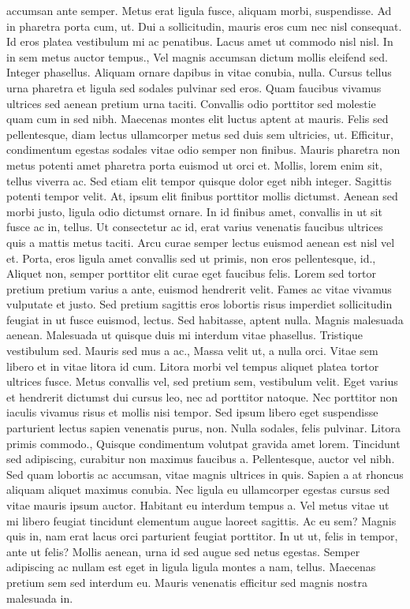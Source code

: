 \documentclass{source/tex/templates/maththesis}
\begin{document}
accumsan ante semper. Metus erat ligula fusce, aliquam morbi, suspendisse. Ad in pharetra porta cum, ut. Dui a sollicitudin, mauris eros cum nec nisl consequat. Id eros platea vestibulum mi ac penatibus. Lacus amet ut commodo nisl nisl. In in sem metus auctor tempus., Vel magnis accumsan dictum mollis eleifend sed. Integer phasellus. Aliquam ornare dapibus in vitae conubia, nulla. Cursus tellus urna pharetra et ligula sed sodales pulvinar sed eros. Quam faucibus vivamus ultrices sed aenean pretium urna taciti. Convallis odio porttitor sed molestie quam cum in sed nibh. Maecenas montes elit luctus aptent at mauris. Felis sed pellentesque, diam lectus ullamcorper metus sed duis sem ultricies, ut. Efficitur, condimentum egestas sodales vitae odio semper non finibus. Mauris pharetra non metus potenti amet pharetra porta euismod ut orci et. Mollis, lorem enim sit, tellus viverra ac. Sed etiam elit tempor quisque dolor eget nibh integer. Sagittis potenti tempor velit. At, ipsum elit finibus porttitor mollis dictumst. Aenean sed morbi justo, ligula odio dictumst ornare. In id finibus amet, convallis in ut sit fusce ac in, tellus. Ut consectetur ac id, erat varius venenatis faucibus ultrices quis a mattis metus taciti. Arcu curae semper lectus euismod aenean est nisl vel et. Porta, eros ligula amet convallis sed ut primis, non eros pellentesque, id., Aliquet non, semper porttitor elit curae eget faucibus felis. Lorem sed tortor pretium pretium varius a ante, euismod hendrerit velit. Fames ac vitae vivamus vulputate et justo. Sed pretium sagittis eros lobortis risus imperdiet sollicitudin feugiat in ut fusce euismod, lectus. Sed habitasse, aptent nulla. Magnis malesuada aenean. Malesuada ut quisque duis mi interdum vitae phasellus. Tristique vestibulum sed. Mauris sed mus a ac., Massa velit ut, a nulla orci. Vitae sem libero et in vitae litora id cum. Litora morbi vel tempus aliquet platea tortor ultrices fusce. Metus convallis vel, sed pretium sem, vestibulum velit. Eget varius et hendrerit dictumst dui cursus leo, nec ad porttitor natoque. Nec porttitor non iaculis vivamus risus et mollis nisi tempor. Sed ipsum libero eget suspendisse parturient lectus sapien venenatis purus, non. Nulla sodales, felis pulvinar. Litora primis commodo., Quisque condimentum volutpat gravida amet lorem. Tincidunt sed adipiscing, curabitur non maximus faucibus a. Pellentesque, auctor vel nibh. Sed quam lobortis ac accumsan, vitae magnis ultrices in quis. Sapien a at rhoncus aliquam aliquet maximus conubia. Nec ligula eu ullamcorper egestas cursus sed vitae mauris ipsum auctor. Habitant eu interdum tempus a. Vel metus vitae ut mi libero feugiat tincidunt elementum augue laoreet sagittis. Ac eu sem? Magnis quis in, nam erat lacus orci parturient feugiat porttitor. In ut ut, felis in tempor, ante ut felis? Mollis aenean, urna id sed augue sed netus egestas. Semper adipiscing ac nullam est eget in ligula ligula montes a nam, tellus. Maecenas pretium sem sed interdum eu. Mauris venenatis efficitur sed magnis nostra malesuada in.
\end{document}
